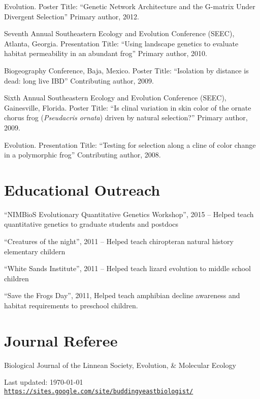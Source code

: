 \documentclass[letterpaper]{article}
\def\footerlink{https://sites.google.com/site/buddingyeastbiologist/}
\renewenvironment{itemize}{
  \begin{list}{}{
    \setlength{\leftmargin}{1.5em}
  }
}{
  \end{list}
}
\begin{document}
\begin{itemize}
\item Evolution. Poster Title: ``Genetic Network Architecture and the G-matrix Under Divergent Selection'' Primary author, 2012.
\item Seventh Annual Southeastern Ecology and Evolution Conference (SEEC), Atlanta, Georgia. Presentation Title: ``Using landscape genetics to evaluate habitat permeability in an abundant frog'' Primary author, 2010.
\item Biogeography Conference, Baja, Mexico. Poster Title: ``Isolation by distance is dead: long live IBD'' Contributing author, 2009.
\item Sixth Annual Southeastern Ecology and Evolution Conference (SEEC), Gainesville, Florida. Poster Title: ``Is clinal variation in skin color of the ornate chorus frog (\textit{Pseudacris ornata}) driven by natural selection?'' Primary author, 2009.
\item Evolution.  Presentation Title: ``Testing for selection along a cline of color change in a polymorphic frog'' Contributing author, 2008.
\end{itemize}

\section*{Educational Outreach}
\begin{itemize}
\item ``NIMBioS Evolutionary Quantitative Genetics Workshop'', 2015 -- Helped teach quantitative genetics to graduate students and postdocs
\item ``Creatures of the night'', 2011 -- Helped teach chiropteran natural history elementary childern
\item ``White Sands Institute'', 2011 -- Helped teach lizard evolution to middle school children
\item ``Save the Frogs Day'', 2011, Helped teach amphibian decline awareness and habitat requirements to preschool children. 
\end{itemize}

\section*{Journal Referee}
\begin{itemize}
\item Biological Journal of the Linnean Society, Evolution, \& Molecular Ecology
\end{itemize}

\bigskip

\begin{center}
  \begin{footnotesize}
    Last updated: \today \\
    \href{\footerlink}{\texttt{\footerlink}}
  \end{footnotesize}
\end{center}
\end{document}

